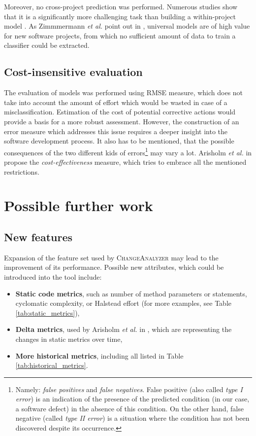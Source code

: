 \documentclass{pracamgr}
\newcommand{\ca}{\textsc{ChangeAnalyzer}\xspace}
\begin{document}
Moreover, no cross-project prediction was performed. Numerous studies show that it is a significantly more challenging task than building a within-project model \cite{recalling, towards, cross-project}. As Zimmmermann \textit{et al.} point out in \cite{cross-project}, universal models are of high value for new software projects, from which no sufficient amount of data to train a classifier could be extracted.

\subsection{Cost-insensitive evaluation}
\label{sec:cost-insensitive}
The evaluation of models was performed using RMSE measure, which does not take into account the amount of effort which would be wasted in case of a misclassification.  Estimation of the cost of potential corrective actions would provide a basis for  a more robust assessment. However, the construction of an error measure which addresses this issue requires a deeper insight into the software development process. It also has to be mentioned, that the possible consequences of the two different kids of errors\footnote{Namely: \emph{false positives} and \emph{false negatives}. False positive (also called \emph{type I error}) is an indication of the presence of the predicted condition (in our case, a software defect) in the absence of this condition. On the other hand, false negative (called \emph{type II error}) is a situation where the condition has not been discovered despite its occurrence.} may vary a lot. Arisholm \textit{et al.} in \cite{systematic} propose the \emph{cost-effectiveness} measure, which tries to embrace all the mentioned restrictions.

\section{Possible further work}
\label{sec:further_work}

\subsection{New features}
\label{sec:new_features}
Expansion of the feature set used by \ca may lead to the improvement of its performance. Possible new attributes, which could be introduced into the tool include:
\begin{itemize}
	\item \textbf{Static code metrics}, such as number of method parameters or statements, cyclomatic complexity, or Halstead effort (for more examples, see Table \ref{tab:static_metrics}),
	\item \textbf{Delta metrics}, used by Arisholm \textit{et al.} in \cite{systematic}, which are representing the changes in static metrics over time,
	\item \textbf{More historical metrics}, including all listed in Table \ref{tab:historical_metrics}.
\end{itemize}
\end{document}
